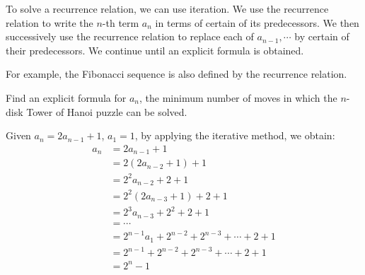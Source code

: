 To solve a recurrence relation, we can use iteration. We use the recurrence relation to write the \(n\)-th term \(a_n\) in terms of certain of its predecessors. We then successively use the recurrence relation to replace each of \(a_{n-1}, \cdots\) by certain of their predecessors. We continue until an explicit formula is obtained. 

For example, the Fibonacci sequence is also defined by the recurrence relation. 

\begin{eg}
  Find an explicit formula for \(a_n\), the minimum number of moves in which the \(n\)-disk Tower of Hanoi puzzle can be solved.

  Given \(a_n = 2a_{n-1} + 1\), \(a_1 = 1\), by applying the iterative method, we obtain:
  \[
    \begin{aligned}
      a_n &= 2a_{n-1} + 1 \\
      &= 2(2a_{n-2} + 1) + 1 \\
      &= 2^2a_{n-2} + 2 + 1 \\
      &= 2^2(2a_{n-3} + 1) + 2 + 1 \\
      &= 2^3a_{n-3} + 2^2 + 2 + 1 \\
      &= \cdots \\
      &= 2^{n-1} a_1 + 2^{n-2} + 2^{n-3} + \cdots + 2 + 1\\
      &= 2^{n-1} + 2^{n-2} + 2^{n-3} + \cdots + 2 + 1\\
      &= 2^n - 1
    \end{aligned}
  \]
\end{eg}
